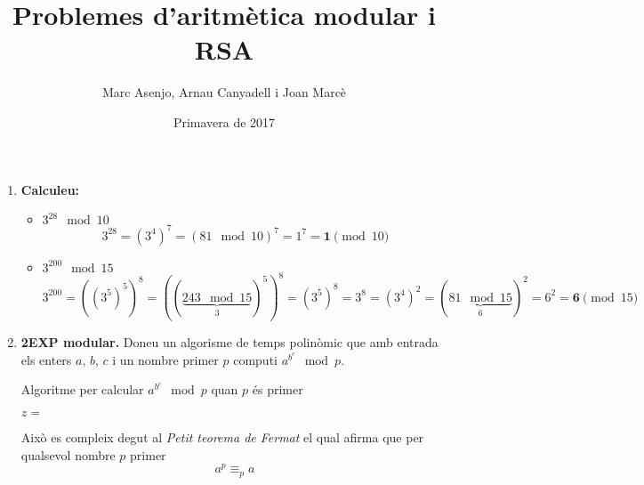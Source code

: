 \documentclass[a4paper]{article}
\title{Problemes  d'aritmètica modular i RSA}
\author{Marc Asenjo, Arnau Canyadell i Joan Marcè}
\date{Primavera de 2017}
\def\und#1{\underbrace{#1}}
\begin{document}
\maketitle

\begin{enumerate}
\item \textbf{Calculeu:}

\begin{itemize}
	\item $3^{28} \mod 10$
	$$
	3^{28} = (3^{4})^7 = (81 \mod 10)^{7} = 1^7 = \boldsymbol{1} \pmod{10}
	$$
	
	\item $3^{200} \mod 15$
	$$3^{200} = ((3^5)^5)^8 = ((\und{243 \mod 15}_3)^5)^8 = (3^5)^8 = 3^8 = (3^4)^2 = (\und{81 \mod 15}_6)^2= 6^2 = \boldsymbol{6} \pmod{15}$$
\end{itemize}
\item \textbf{2EXP modular.} Doneu un algorisme de temps polinòmic que amb entrada els enters $a$, $b$, $c$ i un nombre primer $p$ computi $a^{b^c} \mod p$.

\begin{algorithm}[H]
	\caption{Algoritme per calcular $a^{b^c} \mod p$ quan $p$ és primer}
	\begin{algorithmic}[1]		
			\State $z = $ 
			\State \Return {}
		\EndFunction		
	\end{algorithmic}
\end{algorithm}

Això es compleix degut al \emph{Petit teorema de Fermat} el qual afirma que per qualsevol nombre $p$ primer 
$$
a^p \equiv_{p} a
$$


\end{enumerate}
\end{document}
